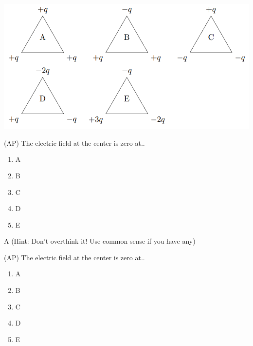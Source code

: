 
\includegraphics{Figures/Figure24}


\begin{question}
(AP) The electric field at the center is zero at..

\begin{multicols}{5}
\begin{enumerate}[label=(\alph*)]
    \item A
    \item B
    \item C
    \item D
    \item E
\end{enumerate}
\end{multicols}

\end{question}

\begin{solution}
A (Hint: Don't overthink it! Use common sense if you have any)
\end{solution}


\begin{question}
(AP) The electric field at the center is zero at..

\begin{multicols}{5}
\begin{enumerate}[label=(\alph*)]
    \item A
    \item B
    \item C
    \item D
    \item E
\end{enumerate}
\end{multicols}

\end{question}

